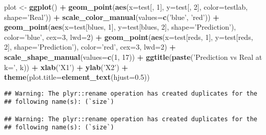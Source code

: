 \documentclass[]{article}
\newenvironment{Shaded}{\begin{snugshade}}{\end{snugshade}}
\newcommand{\DataTypeTok}[1]{\textcolor[rgb]{0.13,0.29,0.53}{#1}}
\newcommand{\DecValTok}[1]{\textcolor[rgb]{0.00,0.00,0.81}{#1}}
\newcommand{\FloatTok}[1]{\textcolor[rgb]{0.00,0.00,0.81}{#1}}
\newcommand{\KeywordTok}[1]{\textcolor[rgb]{0.13,0.29,0.53}{\textbf{#1}}}
\newcommand{\NormalTok}[1]{#1}
\newcommand{\OperatorTok}[1]{\textcolor[rgb]{0.81,0.36,0.00}{\textbf{#1}}}
\newcommand{\StringTok}[1]{\textcolor[rgb]{0.31,0.60,0.02}{#1}}
\begin{document}
\begin{Shaded}
\begin{Highlighting}[]
\NormalTok{plot <-}\StringTok{ }\KeywordTok{ggplot}\NormalTok{() }\OperatorTok{+}\StringTok{ }\KeywordTok{geom_point}\NormalTok{(}\KeywordTok{aes}\NormalTok{(}\DataTypeTok{x=}\NormalTok{test[, }\DecValTok{1}\NormalTok{], }\DataTypeTok{y=}\NormalTok{test[, }\DecValTok{2}\NormalTok{], }\DataTypeTok{color=}\NormalTok{testlab, }\DataTypeTok{shape=}\StringTok{'Real'}\NormalTok{)) }\OperatorTok{+}\StringTok{ }\KeywordTok{scale_color_manual}\NormalTok{(}\DataTypeTok{values=}\KeywordTok{c}\NormalTok{(}\StringTok{'blue'}\NormalTok{, }\StringTok{'red'}\NormalTok{)) }\OperatorTok{+}\StringTok{ }\KeywordTok{geom_point}\NormalTok{(}\KeywordTok{aes}\NormalTok{(}\DataTypeTok{x=}\NormalTok{test[blues, }\DecValTok{1}\NormalTok{], }\DataTypeTok{y=}\NormalTok{test[blues, }\DecValTok{2}\NormalTok{], }\DataTypeTok{shape=}\StringTok{'Prediction'}\NormalTok{), }\DataTypeTok{color=}\StringTok{'blue'}\NormalTok{, }\DataTypeTok{cex=}\DecValTok{3}\NormalTok{, }\DataTypeTok{lwd=}\DecValTok{2}\NormalTok{) }\OperatorTok{+}\StringTok{ }\KeywordTok{geom_point}\NormalTok{(}\KeywordTok{aes}\NormalTok{(}\DataTypeTok{x=}\NormalTok{test[reds, }\DecValTok{1}\NormalTok{], }\DataTypeTok{y=}\NormalTok{test[reds, }\DecValTok{2}\NormalTok{], }\DataTypeTok{shape=}\StringTok{'Prediction'}\NormalTok{), }\DataTypeTok{color=}\StringTok{'red'}\NormalTok{, }\DataTypeTok{cex=}\DecValTok{3}\NormalTok{, }\DataTypeTok{lwd=}\DecValTok{2}\NormalTok{) }\OperatorTok{+}\StringTok{ }\KeywordTok{scale_shape_manual}\NormalTok{(}\DataTypeTok{values=}\KeywordTok{c}\NormalTok{(}\DecValTok{1}\NormalTok{, }\DecValTok{17}\NormalTok{)) }\OperatorTok{+}\StringTok{ }\KeywordTok{ggtitle}\NormalTok{(}\KeywordTok{paste}\NormalTok{(}\StringTok{'Prediction vs Real at k='}\NormalTok{, k)) }\OperatorTok{+}\StringTok{ }\KeywordTok{xlab}\NormalTok{(}\StringTok{'X1'}\NormalTok{) }\OperatorTok{+}\StringTok{ }\KeywordTok{ylab}\NormalTok{(}\StringTok{'X2'}\NormalTok{) }\OperatorTok{+}\StringTok{ }\KeywordTok{theme}\NormalTok{(}\DataTypeTok{plot.title=}\KeywordTok{element_text}\NormalTok{(}\DataTypeTok{hjust=}\FloatTok{0.5}\NormalTok{))}
\end{Highlighting}
\end{Shaded}

\begin{verbatim}
## Warning: The plyr::rename operation has created duplicates for the
## following name(s): (`size`)

## Warning: The plyr::rename operation has created duplicates for the
## following name(s): (`size`)
\end{verbatim}
\end{document}
